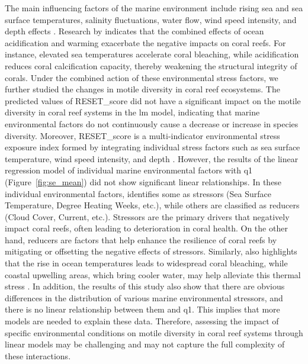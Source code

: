 \documentclass[a4paper, 11]{article}
\begin{document}
The main influencing factors of the marine environment include rising sea and sea surface temperatures, salinity fluctuations, water flow, wind speed intensity, and depth effects \citep{williamson2022monitoring}.  Research by \citet{anthony2011ocean} indicates that the combined effects of ocean acidification and warming exacerbate the negative impacts on coral reefs. For instance, elevated sea temperatures accelerate coral bleaching, while acidification reduces coral calcification capacity, thereby weakening the structural integrity of corals. Under the combined action of these environmental stress factors, we further studied the changes in motile diversity in coral reef ecosystems. The predicted values of RESET\_score did not have a significant impact on the motile diversity in coral reef systems in the lm model, indicating that marine environmental factors do not continuously cause a decrease or increase in species diversity. Moreover, RESET\_score is a multi-indicator environmental stress exposure index formed by integrating individual stress factors such as sea surface temperature, wind speed intensity, and depth \citep{williamson2022monitoring}. However, the results of the linear regression model of individual marine environmental factors with q1 (Figure~\ref{fig:se_mean}) did not show significant linear relationships. In these individual environmental factors, \citet{williamson2022monitoring} identifies some as stressors (Sea Surface Temperature, Degree Heating Weeks, etc.), while others are classified as reducers (Cloud Cover, Current, etc.). Stressors are the primary drivers that negatively impact coral reefs, often leading to deterioration in coral health. On the other hand, reducers are factors that help enhance the resilience of coral reefs by mitigating or offsetting the negative effects of stressors. Similarly, \citet{zhu2022impact} also highlights that the rise in ocean temperatures leads to widespread coral bleaching, while coastal upwelling areas, which bring cooler water, may help alleviate this thermal stress \citep{zhu2022impact}. In addition, the results of this study also show that there are obvious differences in the distribution of various marine environmental stressors, and there is no linear relationship between them and q1. This implies that more models are needed to explain these data. Therefore, assessing the impact of specific environmental conditions on motile diversity in coral reef systems through linear models may be challenging and may not capture the full complexity of these interactions.
\end{document}
